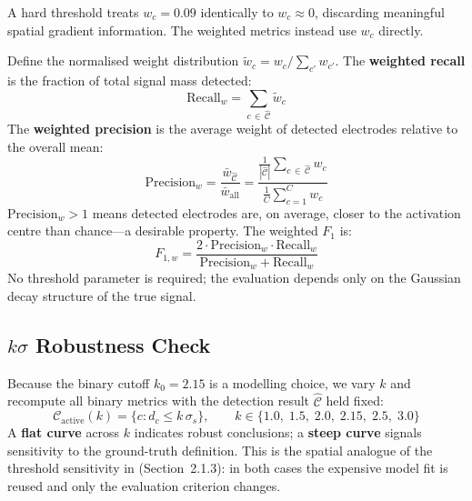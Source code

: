 \documentclass[12pt, a4paper]{article}
\begin{document}
A hard threshold treats $w_c = 0.09$ identically to $w_c \approx 0$,
discarding meaningful spatial gradient information.
The weighted metrics instead use $w_c$ directly.

Define the normalised weight distribution
$\tilde{w}_c = w_c / \sum_{c'} w_{c'}$.
The \textbf{weighted recall} is the fraction of total signal mass detected:
\begin{equation}\label{eq:w_recall}
  \mathrm{Recall}_w = \sum_{c\,\in\,\hat{\mathcal{C}}} \tilde{w}_c
\end{equation}
The \textbf{weighted precision} is the average weight of detected electrodes
relative to the overall mean:
\begin{equation}\label{eq:w_prec}
  \mathrm{Precision}_w
  = \frac{\bar{w}_{\hat{\mathcal{C}}}}{\bar{w}_\text{all}}
  = \frac{\frac{1}{|\hat{\mathcal{C}}|}\sum_{c\,\in\,\hat{\mathcal{C}}} w_c}
         {\frac{1}{C}\sum_{c=1}^{C} w_c}
\end{equation}
$\mathrm{Precision}_w > 1$ means detected electrodes are, on average,
closer to the activation centre than chance---a desirable property.
The weighted $F_1$ is:
\begin{equation}\label{eq:w_f1}
  F_{1,w} =
  \frac{2\cdot\mathrm{Precision}_w\cdot\mathrm{Recall}_w}
       {\mathrm{Precision}_w + \mathrm{Recall}_w}
\end{equation}
No threshold parameter is required; the evaluation depends only on the
Gaussian decay structure of the true signal.

\subsection{\boldmath$k\sigma$ Robustness Check}\label{sec:ksigma}

Because the binary cutoff $k_0 = 2.15$ is a modelling choice, we vary $k$
and recompute all binary metrics with the detection result $\hat{\mathcal{C}}$
held fixed:
\begin{equation}\label{eq:ksigma}
  \mathcal{C}_\text{active}(k) = \{c : d_c \leq k\,\sigma_s\},
  \qquad k \in \{1.0,\;1.5,\;2.0,\;2.15,\;2.5,\;3.0\}
\end{equation}
A \textbf{flat curve} across $k$ indicates robust conclusions;
a \textbf{steep curve} signals sensitivity to the ground-truth definition.
This is the spatial analogue of the threshold sensitivity in
\citet{Nalborczyk2025} (Section~2.1.3): in both cases the expensive
model fit is reused and only the evaluation criterion changes.
\end{document}
